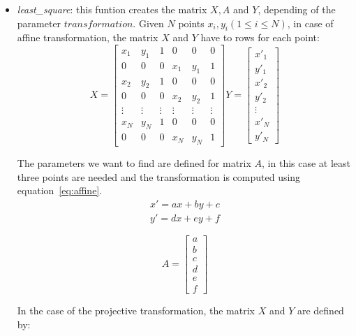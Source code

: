 \begin{itemize}
	\item \textit{least\_square}: this funtion creates the matrix $X,A$ and $Y$, depending of the parameter $transformation$. Given $N$ points $x_i, y_i (1\leq i\leq N ) $, in case of affine transformation, the matrix $X$ and $Y$ have to rows for each point:  
\[
X = 
\begin{bmatrix}
    x_{1}       & y_{1} & 1 & 0 & 0 & 0 \\
    0       & 0 & 0 & x_1 & y_1 & 1 \\
    x_{2}       & y_{2} & 1 & 0 & 0 & 0 \\
    0       & 0 & 0 & x_2 & y_2 & 1 \\
  \vdots & \vdots & \vdots & \vdots & \vdots & \vdots \\

    x_{N}       & y_{N} & 1 & 0 & 0 & 0 \\
    0       & 0 & 0 & x_N & y_N & 1 
\end{bmatrix}
%
Y = 
\begin{bmatrix}
    x'_{1} \\
    y'_{1} \\
    x'_{2}      \\
    y'_{2}   \\
 \vdots \\
    x'_{N}      \\
    y'_{N}   
\end{bmatrix}
\]

The parameters we want to find are defined for matrix $A$, in this case at least three points are needed and the transformation is computed using equation~\ref{eq:affine}.
\begin{equation}
\begin{split}
x'= ax+by+c \\
y'= dx+ey+f
\end{split}
\label{eq:affine}
\end{equation}

\[
A = 
\begin{bmatrix}
    a \\
    b \\
    c      \\
    d   \\ 
    e      \\
    f   
\end{bmatrix}
\]

In the case of the projective transformation, the matrix $X$ and $Y$ are defined by:


\end{itemize}
